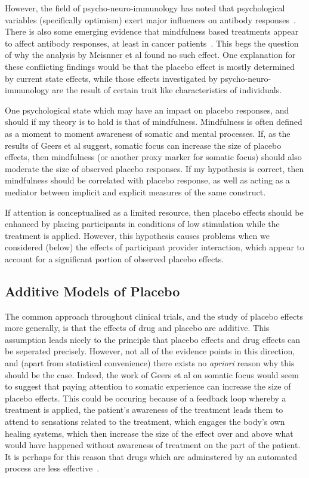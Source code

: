 However, the field of psycho-neuro-immunology has noted that psychological variables (specifically optimism) exert major influences on antibody responses~\cite{Carver2010}. There is also some emerging evidence that mindfulness based treatments appear to affect antibody responses, at least in cancer patients~\cite{Ledesma2009}. This begs the question of why the analysis by Meisnner et al found no such effect. One explanation for these conflicting findings would be that the placebo effect is mostly determined by current state effects, while those effects investigated by psycho-neuro-immunology are the result of certain trait like characteristics of individuals.  

One psychological state which may have an impact on placebo responses, and should if my theory is to hold is that of mindfulness. Mindfulness is often defined as a moment to moment awareness of somatic and mental processes. If, as the results of Geers et al suggest, somatic focus can increase the size of placebo effects, then mindfulness (or another proxy marker for somatic focus) should also moderate the size of observed placebo responses. If my hypothesis is correct, then mindfulness should be correlated with placebo response, as well as acting as a mediator between implicit and explicit measures of the same construct. 

If attention is conceptualised as a limited resource, then placebo effects should be enhanced by placing participants in conditions of low stimulation while the treatment is applied. However, this hypothesis causes problems when we considered (below) the effects of participant provider interaction, which appear to account for a significant portion of observed placebo effects. 

\subsection{Additive Models of Placebo}

The common approach throughout clinical trials, and the study of placebo effects more generally, is that the effects of drug and placebo are additive. This assumption leads nicely to the principle that placebo effects and drug effects can be seperated precisely. However, not all of the evidence points in this direction, and (apart from statistical convenience) there exists no 
{\it apriori\/} reason why this should be the case. Indeed, the work of Geers et al on somatic focus would seem to suggest that paying attention to somatic experience can increase the size of placebo effects. This could be occuring because of a feedback loop whereby a treatment is applied, the patient's awareness of the treatment leads them to attend to sensations related to the treatment, which engages the body's own healing systems, which then increase the size of the effect over and above what would have happened without awareness of treatment on the part of the patient. It is perhaps for this reason that drugs which are adminstered by an automated process are less effective~\cite{benedetti2003}. 

